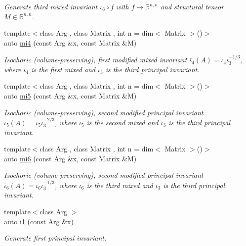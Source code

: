 \begin{DoxyCompactItemize}
\begin{DoxyCompactList}\small\item\em Generate third mixed invariant $ \iota_6\circ f $ with $f\mapsto\mathbb{R}^{n,n}$ and structural tensor $M\in\mathbb{R}^{n,n}$. \end{DoxyCompactList}\item 
{\footnotesize template$<$class Arg , class Matrix , int n = dim$<$ Matrix $>$()$>$ }\\auto \hyperlink{group__InvariantGroup_ga7ee54c5d056877bdefefb8e54ad17791}{mi4} (const Arg \&x, const Matrix \&M)
\begin{DoxyCompactList}\small\item\em Isochoric (volume-\/preserving), first modified mixed invariant $ \bar\iota_4(A)=\iota_4\iota_3^{-1/3} $, where $\iota_4$ is the first mixed and $\iota_3$ is the third principal invariant. \end{DoxyCompactList}\item 
{\footnotesize template$<$class Arg , class Matrix , int n = dim$<$ Matrix $>$()$>$ }\\auto \hyperlink{group__InvariantGroup_ga189bc682b34d13902da335c5eb502faa}{mi5} (const Arg \&x, const Matrix \&M)
\begin{DoxyCompactList}\small\item\em Isochoric (volume-\/preserving), second modified principal invariant $ \bar\iota_5(A)=\iota_5\iota_3^{-2/3} $, where $\iota_5$ is the second mixed and $\iota_3$ is the third principal invariant. \end{DoxyCompactList}\item 
{\footnotesize template$<$class Arg , class Matrix , int n = dim$<$ Matrix $>$()$>$ }\\auto \hyperlink{group__InvariantGroup_ga3e451f9e15fa95080f81d0c0f69f93e6}{mi6} (const Arg \&x, const Matrix \&M)
\begin{DoxyCompactList}\small\item\em Isochoric (volume-\/preserving), second modified principal invariant $ \bar\iota_6(A)=\iota_6\iota_3^{-1/3} $, where $\iota_6$ is the third mixed and $\iota_3$ is the third principal invariant. \end{DoxyCompactList}\item 
{\footnotesize template$<$class Arg $>$ }\\auto \hyperlink{group__InvariantGroup_gafaead59b618d87239270f8eca2bf75c8}{i1} (const Arg \&x)
\begin{DoxyCompactList}\small\item\em Generate first principal invariant. \end{DoxyCompactList}\item 

\end{DoxyCompactItemize}
